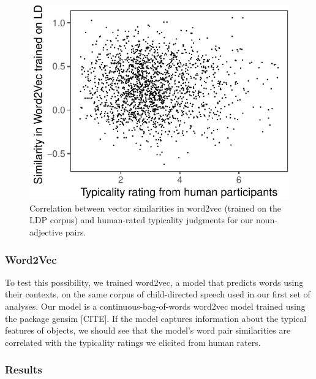 \documentclass[10pt, letterpaper]{article}
\newenvironment{CodeChunk}{}{}
\begin{document}
\begin{CodeChunk}
\begin{figure}[tb]

{\centering \includegraphics{figs/word2vec1-1} 

}

\caption[Correlation between vector similarities in word2vec (trained on the LDP corpus) and human-rated typicality judgments for our noun-adjective pairs]{Correlation between vector similarities in word2vec (trained on the LDP corpus) and human-rated typicality judgments for our noun-adjective pairs.}\label{fig:word2vec1}
\end{figure}
\end{CodeChunk}

\hypertarget{word2vec}{%
\subsubsection{Word2Vec}\label{word2vec}}

To test this possibility, we trained word2vec, a model that predicts
words using their contexts, on the same corpus of child-directed speech
used in our first set of analyses. Our model is a
continuous-bag-of-words word2vec model trained using the package gensim
{[}CITE{]}. If the model captures information about the typical features
of objects, we should see that the model's word pair similarities are
correlated with the typicality ratings we elicited from human raters.

\hypertarget{results-1}{%
\subsubsection{Results}\label{results-1}}
\end{document}
